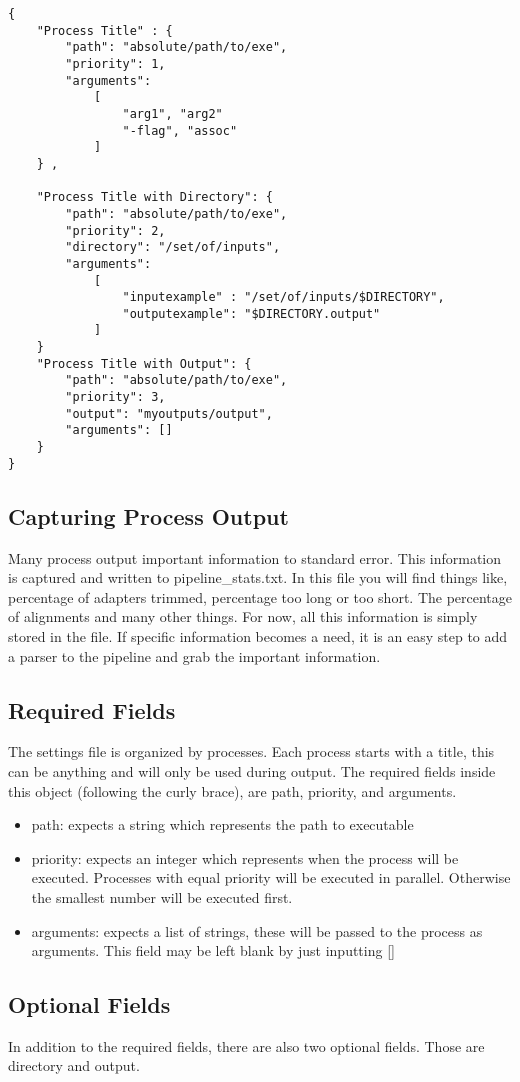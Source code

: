 \documentclass[10pt,a4paper]{article}
\begin{document}
\begin{lstlisting}
{
	"Process Title" : {
		"path": "absolute/path/to/exe",
		"priority": 1,
		"arguments":
			[
				"arg1", "arg2"
				"-flag", "assoc"
			]
	} ,
	
	"Process Title with Directory": {
		"path": "absolute/path/to/exe",
		"priority": 2,
		"directory": "/set/of/inputs",
		"arguments":
			[
				"inputexample" : "/set/of/inputs/$DIRECTORY",
				"outputexample": "$DIRECTORY.output"
			]
	}
	"Process Title with Output": {
		"path": "absolute/path/to/exe",
		"priority": 3,
		"output": "myoutputs/output",
		"arguments": []
	}
}
\end{lstlisting}

\subsection{Capturing Process Output}
Many process output important information to standard error. This information is captured and written to pipeline\_stats.txt. In this file you will find things like, percentage of adapters trimmed, percentage too long or too short. The percentage of alignments and many other things. For now, all this information is simply stored in the file. If specific information becomes a need, it is an easy step to add a parser to the pipeline and grab the important information.

\subsection{Required Fields}
The settings file is organized by processes. Each process starts with a title, this can be anything and will only be used during output. The required fields inside this object (following the curly brace), are path, priority, and arguments. 
\begin{itemize}
	\item{path: expects a string which represents the path to executable}
	\item{priority: expects an integer which represents when the process will be executed. Processes with equal priority will be executed in parallel. Otherwise the smallest number will be executed first.}
	\item{arguments: expects a list of strings, these will be passed to the process as arguments. This field may be left blank by just inputting []} 
\end{itemize}

\subsection{Optional Fields}
In addition to the required fields, there are also two optional fields. Those are directory and output.
\end{document}
